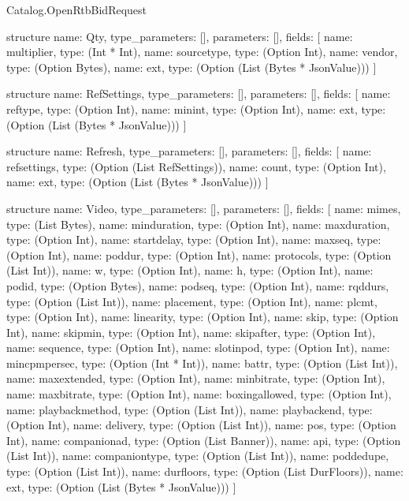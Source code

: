 \begin{lexlean}{Catalog.OpenRtbBidRequest}
\begin{semanticmodule}
structure{
  name: Qty,
  type_parameters: [],
  parameters: [],
  fields: [
    {name: multiplier, type: (Int * Int)},
    {name: sourcetype, type: (Option Int)},
    {name: vendor, type: (Option Bytes)},
    {name: ext, type: (Option (List (Bytes * JsonValue)))}
  ]
}

structure{
  name: RefSettings,
  type_parameters: [],
  parameters: [],
  fields: [
    {name: reftype, type: (Option Int)},
    {name: minint, type: (Option Int)},
    {name: ext, type: (Option (List (Bytes * JsonValue)))}
  ]
}

structure{
  name: Refresh,
  type_parameters: [],
  parameters: [],
  fields: [
    {name: refsettings, type: (Option (List RefSettings))},
    {name: count, type: (Option Int)},
    {name: ext, type: (Option (List (Bytes * JsonValue)))}
  ]
}

structure{
  name: Video,
  type_parameters: [],
  parameters: [],
  fields: [
    {name: mimes, type: (List Bytes)},
    {name: minduration, type: (Option Int)},
    {name: maxduration, type: (Option Int)},
    {name: startdelay, type: (Option Int)},
    {name: maxseq, type: (Option Int)},
    {name: poddur, type: (Option Int)},
    {name: protocols, type: (Option (List Int))},
    {name: w, type: (Option Int)},
    {name: h, type: (Option Int)},
    {name: podid, type: (Option Bytes)},
    {name: podseq, type: (Option Int)},
    {name: rqddurs, type: (Option (List Int))},
    {name: placement, type: (Option Int)},
    {name: plcmt, type: (Option Int)},
    {name: linearity, type: (Option Int)},
    {name: skip, type: (Option Int)},
    {name: skipmin, type: (Option Int)},
    {name: skipafter, type: (Option Int)},
    {name: sequence, type: (Option Int)},
    {name: slotinpod, type: (Option Int)},
    {name: mincpmpersec, type: (Option (Int * Int))},
    {name: battr, type: (Option (List Int))},
    {name: maxextended, type: (Option Int)},
    {name: minbitrate, type: (Option Int)},
    {name: maxbitrate, type: (Option Int)},
    {name: boxingallowed, type: (Option Int)},
    {name: playbackmethod, type: (Option (List Int))},
    {name: playbackend, type: (Option Int)},
    {name: delivery, type: (Option (List Int))},
    {name: pos, type: (Option Int)},
    {name: companionad, type: (Option (List Banner))},
    {name: api, type: (Option (List Int))},
    {name: companiontype, type: (Option (List Int))},
    {name: poddedupe, type: (Option (List Int))},
    {name: durfloors, type: (Option (List DurFloors))},
    {name: ext, type: (Option (List (Bytes * JsonValue)))}
  ]
}


\end{semanticmodule}
\end{lexlean}

